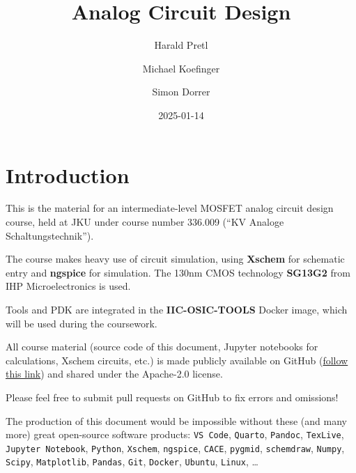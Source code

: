 \documentclass[
  a4paper,
  DIV=11,
  numbers=noendperiod]{scrartcl}
\title{Analog Circuit Design}
\author{Harald Pretl \and Michael Koefinger \and Simon Dorrer}
\date{2025-01-14}
\renewcommand*\contentsname{Table of contents}
\newcommand\contentsname{Table of contents}
\begin{document}
\maketitle

\renewcommand*\contentsname{Table of contents}
{
\hypersetup{linkcolor=}
\setcounter{tocdepth}{3}
\tableofcontents
}

\section{Introduction}\label{sec-intro}

This is the material for an intermediate-level MOSFET analog circuit
design course, held at JKU under course number 336.009 (``KV Analoge
Schaltungstechnik'').

The course makes heavy use of circuit simulation, using \textbf{Xschem}
for schematic entry and \textbf{ngspice} for simulation. The 130nm CMOS
technology \textbf{SG13G2} from IHP Microelectronics is used.

Tools and PDK are integrated in the \textbf{IIC-OSIC-TOOLS} Docker
image, which will be used during the coursework.

\begin{tcolorbox}[enhanced jigsaw, colframe=quarto-callout-important-color-frame, breakable, title=\textcolor{quarto-callout-important-color}{\faExclamation}\hspace{0.5em}{Important}, titlerule=0mm, coltitle=black, arc=.35mm, colback=white, opacitybacktitle=0.6, leftrule=.75mm, toptitle=1mm, left=2mm, bottomrule=.15mm, bottomtitle=1mm, rightrule=.15mm, opacityback=0, toprule=.15mm, colbacktitle=quarto-callout-important-color!10!white]

All course material (source code of this document, Jupyter notebooks for
calculations, Xschem circuits, etc.) is made publicly available on
GitHub (\href{https://github.com/iic-jku/analog-circuit-design}{follow
this link}) and shared under the Apache-2.0 license.

Please feel free to submit pull requests on GitHub to fix errors and
omissions!

The production of this document would be impossible without these (and
many more) great open-source software products: \texttt{VS\ Code},
\texttt{Quarto}, \texttt{Pandoc}, \texttt{TexLive},
\texttt{Jupyter\ Notebook}, \texttt{Python}, \texttt{Xschem},
\texttt{ngspice}, \texttt{CACE}, \texttt{pygmid}, \texttt{schemdraw},
\texttt{Numpy}, \texttt{Scipy}, \texttt{Matplotlib}, \texttt{Pandas},
\texttt{Git}, \texttt{Docker}, \texttt{Ubuntu}, \texttt{Linux}, \ldots{}

\end{tcolorbox}
\end{document}
